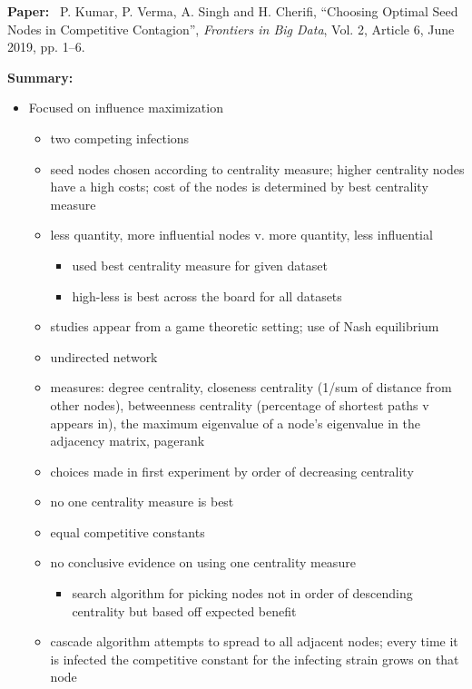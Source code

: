 \documentclass[11pt]{article}
\begin{document}
\clearpage

\noindent
\textbf{Paper:}~  P. Kumar, P. Verma, A. Singh and H. Cherifi, 
``Choosing Optimal Seed Nodes in Competitive Contagion”, 
\emph{Frontiers in Big Data}, Vol. 2, Article 6, June 2019, pp. 1--6.

\medskip

\noindent
\textbf{Summary:}

\begin{itemize}
\item Focused on influence maximization
  \begin{itemize}
     \item two competing infections
     \item seed nodes chosen according to centrality measure; 
           higher centrality nodes have a high costs; 
           cost of the nodes is determined by best centrality measure
    \item less quantity, more influential nodes v. more quantity, less influential
        \begin{itemize}
	   \item used best centrality measure for given dataset
	   \item high-less is best across the board for all datasets
        \end{itemize}
	\item studies appear from a game theoretic setting; use of Nash equilibrium
	\item undirected network
	\item measures: degree centrality, closeness centrality
	(1/sum of distance from other nodes), betweenness centrality
	(percentage of shortest paths v appears in), the maximum
	eigenvalue of a node’s eigenvalue in the adjacency matrix,
	pagerank
	\item choices made in first experiment by order of decreasing centrality
	\item no one centrality measure is best
	\item equal competitive constants
	\item no conclusive evidence on using one centrality measure
            \begin{itemize}
		\item search algorithm for picking nodes not in
		order of descending centrality but based off expected
		benefit
            \end{itemize}
	\item cascade algorithm attempts to spread to all adjacent
	nodes; every time it is infected the competitive constant
	for the infecting strain grows on that node
   \end{itemize}
\end{itemize}
\end{document}
